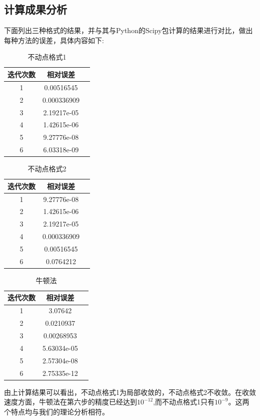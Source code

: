 \documentclass{ctexart}
\begin{document}
\subsection{计算成果分析}
下面列出三种格式的结果，并与其与Python的Scipy包计算的结果进行对比，做出每种方法的误差，具体内容如下:
\begin{center}
    \begin{longtable}{|c|c|c|}
        \caption{不动点格式1}\\
        \hline
        迭代次数& 相对误差\\
        \hline
        1& 0.00516545\\
        \hline
        2& 0.000336909\\
        \hline
        3& 2.19217e-05\\
        \hline
        4& 1.42615e-06\\
        \hline
        5& 9.27776e-08\\
        \hline
        6& 6.03318e-09\\
        \hline
    \end{longtable}
\end{center}
\begin{center}
    \begin{longtable}{|c|c|c|}
        \caption{不动点格式2}\\
        \hline
        迭代次数& 相对误差\\
        \hline
        1& 9.27776e-08\\
        \hline
        2& 1.42615e-06\\
        \hline
        3& 2.19217e-05\\
        \hline
        4& 0.000336909\\
        \hline
        5& 0.00516545\\
        \hline
        6& 0.0764212\\
        \hline        
    \end{longtable}
\end{center}
\begin{center}
    \begin{longtable}{|c|c|c|}
        \caption{牛顿法}\\
        \hline
        迭代次数& 相对误差\\
        \hline
        1& 3.07642\\
        \hline
        2& 0.0210937\\
        \hline
        3& 0.00268953\\
        \hline
        4& 5.63034e-05\\
        \hline
        5& 2.57304e-08\\
        \hline
        6& 2.75335e-12\\
        \hline
    \end{longtable}
\end{center}
由上计算结果可以看出，不动点格式1为局部收敛的，不动点格式2不收敛。在收敛速度方面，牛顿法在第六步的精度已经达到$10^{-12}$,而不动点格式1只有$10^{-9}$。这两个特点均与我们的理论分析相符。
\end{document}
